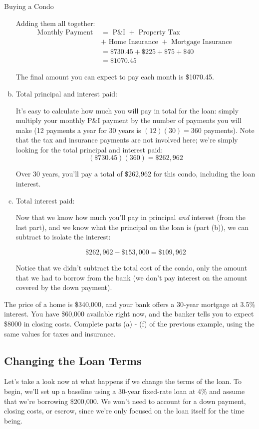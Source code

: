 \begin{example}[https://www.youtube.com/watch?v=B0SeINL8R0g&list=PLfmpjsIzhztsZtnb7HnXrQ8SLoiOCIcAM&index=37]{Buying a Condo}
\begin{enumerate}[(a)]
Adding them all together:
\begin{align*}
\textrm{Monthly Payment } &= \textrm{ P\&I } + \textrm{ Property Tax }\\
&+ \textrm{ Home Insurance } + \textrm{ Mortgage Insurance }\\
&= \$730.45 + \$225 + \$75 + \$40\\
&= \boxed{\$1070.45}
\end{align*}

The final amount you can expect to pay each month is \$1070.45.

\item Total principal and interest paid:

It's easy to calculate how much you will pay in total for the loan: simply multiply your monthly P\&I payment by the number of payments you will make (12 payments a year for 30 years is $(12)(30) = 360$ payments).  Note that the tax and insurance payments are not involved here; we're simply looking for the total principal and interest paid:
\[(\$730.45)(360) = \boxed{\$262,962}\]

Over 30 years, you'll pay a total of \$262,962 for this condo, including the loan interest.

\item Total interest paid:

Now that we know how much you'll pay in principal \emph{and} interest (from the last part), and we know what the principal on the loan is (part (b)), we can subtract to isolate the interest:

\[\$262,962 - \$153,000 = \boxed{\$109,962}\]

Notice that we didn't subtract the total cost of the condo, only the amount that we had to borrow from the bank (we don't pay interest on the amount covered by the down payment).
\end{enumerate}
\end{example}

\begin{try}
The price of a home is \$340,000, and your bank offers a 30-year mortgage at 3.5\% interest.  You have \$60,000 available right now, and the banker tells you to expect \$8000 in closing costs.  Complete parts (a) - (f) of the previous example, using the same values for taxes and insurance.
\end{try}
\pagebreak

\subsection{Changing the Loan Terms}
Let's take a look now at what happens if we change the terms of the loan.  To begin, we'll set up a baseline using a 30-year fixed-rate loan at 4\% and assume that we're borrowing \$200,000.  We won't need to account for a down payment, closing costs, or escrow, since we're only focused on the loan itself for the time being.

